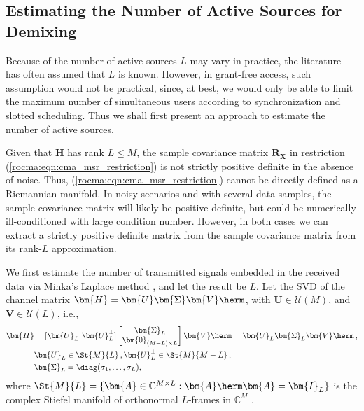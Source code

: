 \subsection{Estimating the Number of Active Sources for Demixing}\label{rocma:ssec:estimate_sources}
Because of the number of active sources $L$ may vary in practice, the literature has often assumed that $L$ is known. 
However, in grant-free access, such assumption would not be practical, since, at best, we would only be able to limit the maximum number of simultaneous users according to synchronization and slotted scheduling. 
Thus we shall first present an approach to estimate the number of active sources. 


Given that $\bm{H}$ has rank $L\leq M$, the sample covariance matrix $\bm{R}_{\bm{X}}$ in restriction (\ref{rocma:eqn:cma_msr_restriction}) is not strictly positive definite in the absence of noise.
Thus, (\ref{rocma:eqn:cma_msr_restriction}) cannot be directly defined as a Riemannian manifold. 
In noisy scenarios and with several data samples, the sample covariance matrix will likely be positive definite, but could be numerically ill-conditioned with large condition number. 
However, in both cases we can extract a strictly positive definite matrix from the sample covariance matrix from its rank-$L$ approximation. 

We first estimate the number of transmitted signals embedded in the received data via Minka's Laplace method \cite{Minka2000laplaceTR}, and let the result
be $L$. 
Let the SVD of the channel matrix $\bm{H} = \bm{U}\bm{\Sigma}\bm{V}\herm$, with $\bm{U}\in\mathcal{U}(M)$, and $\bm{V}\in\mathcal{U}(L)$, i.e.,
\begin{align}
	\bm{H}&=[\bm{U}_L\,\,\bm{U}_L^{\perp}]\begin{bmatrix}
		\bm{\Sigma}_L\\\bm{0}_{(M-L)\times L}
	\end{bmatrix}\bm{V}\herm=\bm{U}_L\bm{\Sigma}_L\bm{V}\herm\,,\nonumber\\
	&\bm{U}_L\in\St{M}{L}\,,
	\bm{U}_L^{\perp}\in\St{M}{M-L}\,,\nonumber\\
	&\bm{\Sigma}_L=\diag(\sigma_1,\ldots,\sigma_L),  
\end{align}
where $\St{M}{L}=\{\bm{A}\in\mathbb{C}^{M\times L}:\bm{A}\herm\bm{A}=\bm{I}_L\}$ is the complex Stiefel manifold of orthonormal $L$-frames in $\mathbb{C}^M$ \cite{Edelman1999stiefel,Sato2014complexstiefel}.

